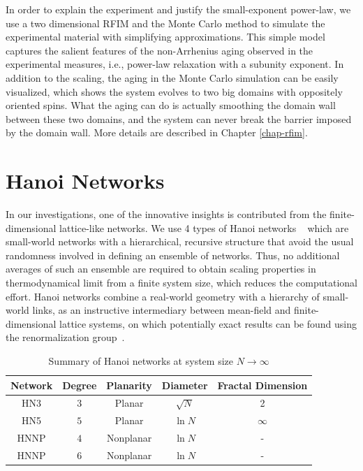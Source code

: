 In order to explain the experiment and justify the small-exponent power-law, we use a two dimensional RFIM and the Monte Carlo method to simulate the experimental material with simplifying approximations. This simple model captures the salient features of the non-Arrhenius aging observed in the experimental measures, i.e., power-law relaxation with a subunity exponent. In addition to the scaling, the aging in the Monte Carlo simulation can be easily visualized, which shows the system evolves to two big domains with oppositely oriented spins. What the aging can do is actually smoothing the domain wall between these two domains, and the system can never break the barrier imposed by the domain wall. More details are described in Chapter \ref{chap-rfim}.

\section{Hanoi Networks}
\label{sec:HN} 
In our investigations, one of the innovative insights is contributed from the finite-dimensional lattice-like networks. We use 4 types of Hanoi networks ~\cite{Boettcher2008HN} which are small-world networks with a hierarchical, recursive structure that avoid the usual randomness involved in defining
an ensemble of networks. Thus, no additional averages of such an ensemble
are required to obtain scaling properties in thermodynamical limit
from a finite system size, which reduces the computational effort.
Hanoi networks combine a real-world geometry with a hierarchy of small-world
links, as an instructive intermediary between mean-field and finite-dimensional
lattice systems, on which potentially exact results can be found using
the renormalization group~\cite{BoHa11}. 

\begin{table}
\begin{centering}
\protect\caption{\label{tab:hns} 
Summary of Hanoi networks at system size $N\rightarrow\infty$ }
\par\end{centering}
\begin{centering}
\par\end{centering}
\centering{}%
\begin{tabular}{|c|c|c|c|c|}
\hline 
Network & Degree  & Planarity & Diameter & Fractal Dimension  \tabularnewline
\hline 
\hline 
HN3  & $3$ & Planar & $\sqrt{N}$ & 2 \tabularnewline
\hline 
HN5  & $5$ & Planar &  $\ln N$ & $\infty$  \tabularnewline
\hline 
HNNP  & $4$  & Nonplanar &  $\ln N$ & -  \tabularnewline
\hline 
HNNP  & $6$  & Nonplanar &  $\ln N$ & - \tabularnewline
\hline 
\end{tabular}
\end{table}


